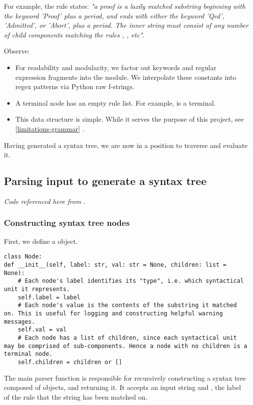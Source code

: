 For example, the  rule states: \emph{"a proof is a lazily matched substring beginning with the keyword 'Proof' plus a period, and ends with either the keyword 'Qed', 'Admitted', or 'Abort', plus a period. The inner string must consist of any number of child components matching the rules , , etc"}.

Observe:
\begin{itemize}
    \item For readability and modularity, we factor out keywords and regular expression fragments into the  module. We interpolate these constants into regex patterns via Python raw f-strings.
    \item A terminal node has an empty rule list. For example,  is a terminal.
    \item This data structure is simple. While it serves the purpose of this project, see \ref{limitations-grammar} .
\end{itemize}


Having generated a syntax tree, we are now in a position to traverse and evaluate it.

\subsection{Parsing input to generate a syntax tree}
\emph{Code referenced here from .}

\subsubsection{Constructing syntax tree nodes}
\label{constructing-nodes}
First, we define a  object.
\begin{verbatim}
class Node:
def __init__(self, label: str, val: str = None, children: list = None):
    # Each node's label identifies its "type", i.e. which syntactical unit it represents.
    self.label = label
    # Each node's value is the contents of the substring it matched on. This is useful for logging and constructing helpful warning messages.
    self.val = val
    # Each node has a list of children, since each syntactical unit may be comprised of sub-components. Hence a node with no children is a terminal node.
    self.children = children or []
\end{verbatim}

The main parser function  is responsible for recursively constructing a syntax tree composed of  objects, and returning it. It accepts an input string  and , the label of the rule that the string has been matched on.

